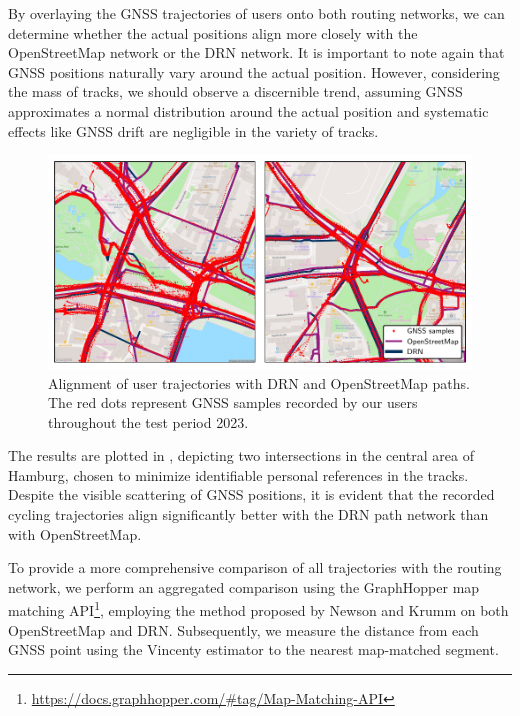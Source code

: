 By overlaying the GNSS trajectories of users onto both routing networks, we can determine whether the actual positions align more closely with the OpenStreetMap network or the DRN network. It is important to note again that GNSS positions naturally vary around the actual position. However, considering the mass of tracks, we should observe a discernible trend, assuming GNSS approximates a normal distribution around the actual position and systematic effects like GNSS drift are negligible in the variety of tracks.

\begin{figure}[t]
\centering 
\includegraphics[width=\linewidth]{images/routing-mapmatching-distance.pdf}
\caption{Alignment of user trajectories with DRN and OpenStreetMap paths. The red dots represent GNSS samples recorded by our users throughout the test period 2023.}
\label{fig:routing-mapmatching-distance}
\end{figure}

The results are plotted in , depicting two intersections in the central area of Hamburg, chosen to minimize identifiable personal references in the tracks. Despite the visible scattering of GNSS positions, it is evident that the recorded cycling trajectories align significantly better with the DRN path network than with OpenStreetMap.

To provide a more comprehensive comparison of all trajectories with the routing network, we perform an aggregated comparison using the GraphHopper map matching API\footnote{\url{https://docs.graphhopper.com/\#tag/Map-Matching-API}}, employing the method proposed by Newson and Krumm \cite{newson_hidden_2009} on both OpenStreetMap and DRN. Subsequently, we measure the distance from each GNSS point using the Vincenty estimator to the nearest map-matched segment.

